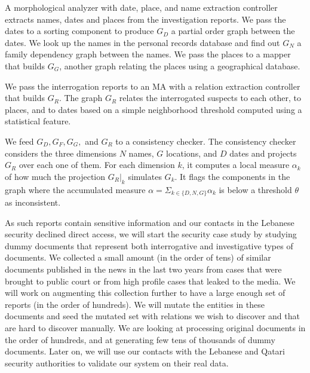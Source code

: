 \documentclass[12pt]{article}
\begin{document}
A morphological analyzer with date, place, and name extraction controller extracts
names, dates and places from the investigation reports. 
We pass the dates to a sorting component to produce $G_D$ 
a partial order graph between the dates. 
We look up the names in the personal records database and find out
$G_N$ a family dependency graph between the names. 
We pass the places to a mapper that builds $G_G$,
another graph relating the places using a geographical database. 

We pass the interrogation reports to an MA with a relation 
extraction controller that builds $G_R$. 
The graph $G_R$ relates the interrogated suspects
to each other, to places, and to dates based on a simple
neighborhood threshold computed using a statistical feature. 

We feed $G_D, G_F, G_G,$ and $G_R$   
to a consistency checker.
The consistency checker considers the three dimensions 
$N$ names, $G$ locations, and $D$ dates and projects $G_R$
over each one of them.
For each dimension $k$, it computes a local measure 
$\alpha_k$ of how much the projection $G_R|_k$ simulates $G_k$. 
It flags the components in the graph where the accumulated 
measure $\alpha= \Sigma_{k\in\{D,N,G\}} \alpha_k$ is
below a threshold $\theta$ as inconsistent. 

\begin{figure}
\end{figure}

As such reports contain sensitive information and our contacts
in the Lebanese security declined direct access, 
we will start the security case study by studying dummy documents that 
represent both interrogative and investigative types of documents. 
We collected a small amount (in the order of tens)
of similar documents published in the news in the last two years
from cases that were brought to public court or from high profile
cases that leaked to the media.
We will work on augmenting this collection further to have a large
enough set of reports (in the order of hundreds). 
We will mutate the entities in these documents and seed the mutated
set with relations we wish to discover and that are hard to discover
manually. 
We are looking at processing original documents in the order
of hundreds, and at generating few tens of thousands of dummy 
documents.
Later on, we will use our contacts with the Lebanese and Qatari 
security authorities
to validate our system on their real data. 
\end{document}
